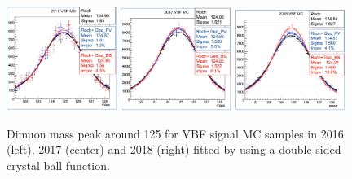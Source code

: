 \begin{figure}[h!]
    \centering
    \includegraphics[width=0.32\textwidth]{images_geofit/VBF_mass_geofit_2016.png}
    \includegraphics[width=0.32\textwidth]{images_geofit/VBF_mass_geofit_2017.png}
    \includegraphics[width=0.32\textwidth]{images_geofit/VBF_mass_geofit_2018.png}
    \caption{Dimuon mass peak around 125 \gev for VBF signal MC samples in 2016 (left), 2017 (center) and 2018 (right) fitted by using a double-sided crystal ball function.}
    \label{fig:dimu_mass_VBF}
\end{figure}

